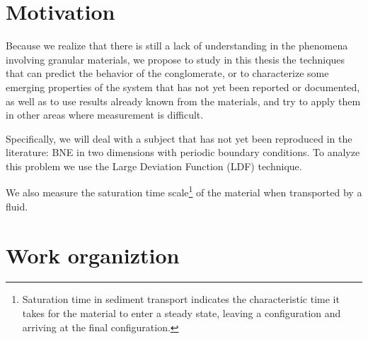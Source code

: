 \section{Motivation}
\label{sec:motivacao}

    
    Because we realize that there is still a lack of understanding in the phenomena involving granular materials, we propose to study in this thesis the techniques that can predict the behavior of the conglomerate, or to characterize some emerging properties of the system that has not yet been reported or documented, as well as to use results already known from the materials, and try to apply them in other areas where measurement is difficult.


    Specifically, we will deal with a subject that has not yet been reproduced in the literature: BNE in two dimensions with periodic boundary conditions. To analyze this problem we use the Large Deviation Function (LDF) \cite{Large_Deviations_in_Physics} technique.


    We also measure the saturation time scale\footnote{Saturation time in sediment transport indicates the characteristic time it takes for the material to enter a steady state, leaving a configuration and arriving at the final configuration.} of the material when transported by a fluid.

\section{Work organiztion}
\label{sec:organizacaoTrabalho}

